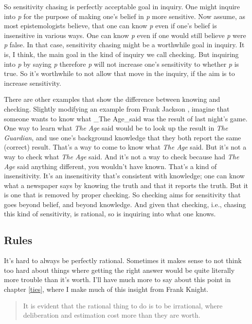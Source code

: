 \documentclass[
  11pt,
]{book}
\begin{document}
So sensitivity chasing is perfectly acceptable goal in inquiry. One might inquire into \emph{p} for the purpose of making one's belief in \emph{p} more sensitive. Now assume, as most epistemologists believe, that one can know \emph{p} even if one's belief is insensitive in various ways. One can know \emph{p} even if one would still believe \emph{p} were \emph{p} false. In that case, sensitivity chasing might be a worthwhile goal in inquiry. It is, I think, the main goal in the kind of inquiry we call checking. But inquiring into \emph{p} by saying \emph{p} therefore \emph{p} will not increase one's sensitivity to whether \emph{p} is true. So it's worthwhile to not allow that move in the inquiry, if the aim is to increase sensitivity.

There are other examples that show the difference between knowing and checking. Slightly modifying an example from Frank Jackson \citeyearpar{Jackson1987}, imagine that someone wants to know what \_The Age\_said was the result of last night's game. One way to learn what \emph{The Age} said would be to look up the result in \emph{The Guardian}, and use one's background knowledge that they both report the same (correct) result. That's a way to come to know what \emph{The Age} said. But it's not a way to check what \emph{The Age} said. And it's not a way to check because had \emph{The Age} said anything different, you wouldn't have known. That's a kind of insensitivity. It's an insensitivity that's consistent with knowledge; one can know what a newspaper says by knowing the truth and that it reports the truth. But it is one that is removed by proper checking. So checking aims for sensitivity that goes beyond belief, and beyond knowledge. And given that checking, i.e., chasing this kind of sensitivity, is rational, so is inquiring into what one knows.

\hypertarget{rulesinquiry}{%
\subsection{Rules}\label{rulesinquiry}}

It's hard to always be perfectly rational. Sometimes it makes sense to not think too hard about things where getting the right answer would be quite literally more trouble than it's worth. I'll have much more to say about this point in chapter \ref{ties}, where I make much of this insight from Frank Knight.

\begin{quote}
It is evident that the rational thing to do is to be irrational, where deliberation and estimation cost more than they are worth. \citep[ 67fn1]{Knight1921}
\end{quote}
\end{document}
